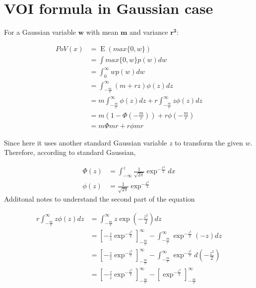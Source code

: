 \documentclass[11pt,a4paper]{article}
\begin{document}

\section*{VOI formula in Gaussian case}

For a Gaussian variable $\mathbf{w}$ with mean $\mathbf{m}$ and variance $\mathbf{r^2}$:

\begin{equation*}
    \begin{split}
	PoV(x) &= \mathop{E}\left(max\{0, w\}\right) \\
            & = \int{max\{0, w\}p(w)dw} \\
            & = \int_0^{\infty}{wp(w)dw} \\
            & = \int_{-\frac{m}{r}}^{\infty} (m + rz)\phi(z)dz \\
            & = m\int_{-\frac{m}{r}}^{\infty}\phi(z)dz + r\int_{-\frac{m}{r}}^{\infty}z\phi(z)dz\\
            & = m(1 - \Phi(-\frac{m}{r})) + r\phi(-\frac{m}{r})\\
            & = m\Phi{m}{r} + r\phi{m}{r}
    \end{split}
\end{equation*}

Since here it uses another standard Gaussian variable $z$ to transform the given $w$. Therefore, according to standard Gaussian, 

\begin{equation*}
	\begin{split}
		\Phi(z) &= \int_{-\infty}^{z} \frac{1}{\sqrt{2\pi}}\exp^{-\frac{x^2}{2}}dx \\
		\phi(z) & = \frac{1}{\sqrt{2\pi}}\exp^{-\frac{x^2}{2}}
	\end{split}
\end{equation*}
Additonal notes to understand the second part of the equation

\begin{equation*}
    \begin{split}
	r\int_{-\frac{m}{r}}^{\infty} z\phi(z)dz &=\int_{-\frac{m}{r}}^{\infty} z\exp(-\frac{z^2}{2})dz\\
	&= \left[-\frac{z}{z}\exp^{-\frac{z^2}{2}}\right]_{-\frac{m}{r}}^{\infty} - \int_{-\frac{m}{r}}^{\infty} \exp^{-\frac{z^2}{2}}(-z)dz\\
	&= \left[-\frac{z}{z}\exp^{-\frac{z^2}{2}}\right]_{-\frac{m}{r}}^{\infty} - \int_{-\frac{m}{r}}^{\infty} \exp^{-\frac{z^2}{2}}d(-\frac{z^2}{2})\\
	&= \left[-\frac{z}{z}\exp^{-\frac{z^2}{2}}\right]_{-\frac{m}{r}}^{\infty} - \left[\exp^{-\frac{z^2}{2}}\right]_{-\frac{m}{r}}^{\infty}\\
    \end{split}
\end{equation*}
\end{document}
